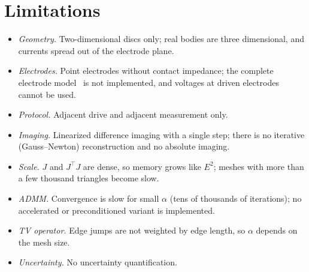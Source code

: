 \documentclass[11pt,a4paper]{article}
\begin{document}
\section{Limitations}\label{sec:limitations}

\begin{itemize}
  \item \emph{Geometry.} Two-dimensional discs only; real bodies are three
        dimensional, and currents spread out of the electrode plane.
  \item \emph{Electrodes.} Point electrodes without contact impedance; the
        complete electrode model~\cite{SomersaloCheneyIsaacson1992} is not
        implemented, and voltages at driven electrodes cannot be used.
  \item \emph{Protocol.} Adjacent drive and adjacent measurement only.
  \item \emph{Imaging.} Linearized difference imaging with a single step;
        there is no iterative (Gauss--Newton) reconstruction and no absolute
        imaging.
  \item \emph{Scale.} $J$ and $J^\top J$ are dense, so memory grows like
        $E^2$; meshes with more than a few thousand triangles become slow.
  \item \emph{ADMM.} Convergence is slow for small $\alpha$ (tens of
        thousands of iterations); no accelerated or preconditioned variant is
        implemented.
  \item \emph{TV operator.} Edge jumps are not weighted by edge length, so
        $\alpha$ depends on the mesh size.
  \item \emph{Uncertainty.} No uncertainty quantification.
\end{itemize}
\end{document}
